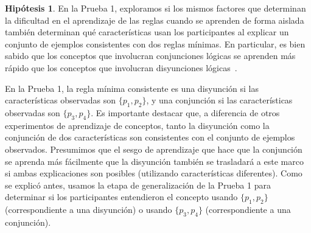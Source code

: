 \theoremstyle{definition}
\newtheorem{hyp}{Hipótesis}
\renewcommand\thehyp{\Roman{hyp}}
 

\begin{hyp}\label{Hip:AndOverOr} 
En la Prueba 1, exploramos si los mismos factores que determinan la dificultad en el aprendizaje de las reglas cuando se aprenden de forma aislada también determinan qué características usan los participantes al explicar un conjunto de ejemplos consistentes con dos reglas mínimas. En particular, es bien sabido que los conceptos que involucran conjunciones lógicas se aprenden más rápido que los conceptos que involucran disyunciones lógicas~\cite{bourne1970knowing}.

En la Prueba 1, la regla mínima consistente es una disyunción si las características observadas son $\{p_1, p_2 \}$, y una conjunción si las características observadas son $\{p_3, p_4 \}$. Es importante destacar que, a diferencia de otros experimentos de aprendizaje de conceptos, tanto la disyunción como la conjunción de dos características son consistentes con el conjunto de ejemplos observados. Presumimos que el sesgo de aprendizaje que hace que la conjunción se aprenda más fácilmente que la disyunción también se trasladará a este marco si ambas explicaciones son posibles (utilizando características diferentes). Como se explicó antes, usamos la etapa de generalización de la Prueba 1 para determinar si los participantes entendieron el concepto usando $\{p_1, p_2 \}$ (correspondiente a una disyunción) o usando $\{p_3, p_4 \} $ (correspondiente a una conjunción).


\end{hyp}
